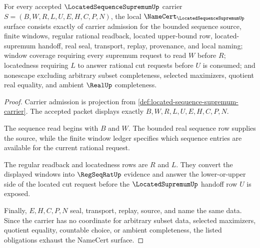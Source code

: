 \begin{theorem}
\label{thm:located-sequence-supremum-namecert-obligations}
For every accepted $\LocatedSequenceSupremumUp$ carrier $S=(B,W,R,L,U,E,H,C,P,N)$, the local $\NameCert_{\LocatedSequenceSupremumUp}$ surface consists exactly of carrier admission for the bounded sequence source, finite windows, regular rational readback, located upper-bound row, located-supremum handoff, real seal, transport, replay, provenance, and local naming; window coverage requiring every supremum request to read $W$ before $R$; locatedness requiring $L$ to answer rational cut requests before $U$ is consumed; and nonescape excluding arbitrary subset completeness, selected maximizers, quotient real equality, and ambient $\RealUp$ completeness.
\end{theorem}
\begin{proof}
Carrier admission is projection from \autoref{def:located-sequence-supremum-carrier}. The accepted packet displays exactly $B,W,R,L,U,E,H,C,P,N$.

The sequence read begins with $B$ and $W$. The bounded real sequence row supplies the source, while the finite window ledger specifies which sequence entries are available for the current rational request.

The regular readback and locatedness rows are $R$ and $L$. They convert the displayed windows into $\RegSeqRatUp$ evidence and answer the lower-or-upper side of the located cut request before the $\LocatedSupremumUp$ handoff row $U$ is exposed.

Finally, $E,H,C,P,N$ seal, transport, replay, source, and name the same data. Since the carrier has no coordinate for arbitrary subset data, selected maximizers, quotient equality, countable choice, or ambient completeness, the listed obligations exhaust the NameCert surface.
\end{proof}

